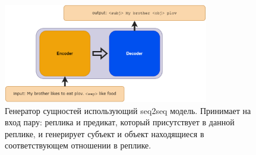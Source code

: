 \begin{figure}[!ht]
    \centering
    \includegraphics[width=0.8\textwidth]{images/egen.png}
    \caption{Генератор сущностей использующий seq2seq модель. Принимает на вход пару: реплика и предикат, который присутствует в данной реплике, и генерирует субъект и объект находящиеся в соответствующем отношении в реплике.}
    \label{fig:egen}
\end{figure}
